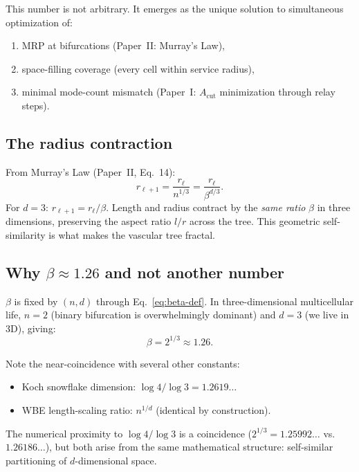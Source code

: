 \documentclass[aps,pre,twocolumn,superscriptaddress,longbibliography]{revtex4-2}
\newcommand{\Acut}{A_{\text{cut}}}
\begin{document}
This number is not arbitrary.
It emerges as the unique solution to simultaneous
optimization of:
\begin{enumerate}
  \item MRP at bifurcations (Paper~II: Murray's Law),
  \item space-filling coverage (every cell within service
    radius),
  \item minimal mode-count mismatch (Paper~I: $\Acut$
    minimization through relay steps).
\end{enumerate}


\subsection{The radius contraction}

From Murray's Law (Paper~II, Eq.~14):
\begin{equation}
  r_{\ell+1} = \frac{r_\ell}{n^{1/3}} = \frac{r_\ell}{\beta^{d/3}}.
  \label{eq:radius-ratio}
\end{equation}
For $d = 3$: $r_{\ell+1} = r_\ell / \beta$.
Length and radius contract by the \emph{same ratio}
$\beta$ in three dimensions, preserving the aspect ratio
$l/r$ across the tree.
This geometric self-similarity is what makes the vascular
tree fractal.


\subsection{Why $\beta \approx 1.26$ and not another number}

$\beta$ is fixed by $(n, d)$ through Eq.~\eqref{eq:beta-def}.
In three-dimensional multicellular life, $n = 2$
(binary bifurcation is overwhelmingly dominant) and
$d = 3$ (we live in 3D), giving:
\begin{equation}
  \beta = 2^{1/3} \approx 1.26.
\end{equation}

Note the near-coincidence with several other constants:
\begin{itemize}
  \item Koch snowflake dimension:
    $\log 4 / \log 3 = 1.2619\ldots$
  \item WBE length-scaling ratio: $n^{1/d}$ (identical
    by construction).
\end{itemize}
The numerical proximity to $\log 4/\log 3$ is
a coincidence ($2^{1/3} = 1.25992\ldots$ vs.\
$1.26186\ldots$), but both arise from the same
mathematical structure: self-similar partitioning of
$d$-dimensional space.
\end{document}
